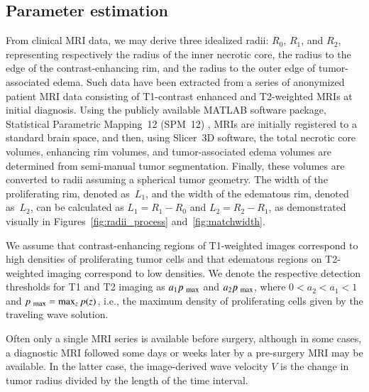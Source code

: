 \documentclass{aims}
\numberwithin{equation}{section}
\begin{document}
\subsection{Parameter estimation}
\label{paramest-sec}

From clinical MRI data, we may derive three idealized radii:
$R_{0}$, $R_{1}$, and $R_{2}$, representing respectively the radius of the
inner necrotic core, the radius to the edge of the contrast-enhancing rim,
and the radius to the outer edge of tumor-associated edema.  Such data have
been extracted from a series of anonymized patient MRI data consisting of
T1-contrast enhanced and T2-weighted MRIs at initial diagnosis.  Using
the publicly available MATLAB software package, Statistical Parametric Mapping~12 (SPM~12) \cite{Penny2007}, MRIs are initially registered to a standard brain
space, and then, using Slicer~3D \cite{Fedorov2012} software, the total necrotic core
volumes, enhancing rim volumes, and tumor-associated edema volumes are
determined from semi-manual tumor segmentation.  Finally, these volumes are
converted to radii assuming a spherical tumor geometry.  The width of the
proliferating rim, denoted as~$L_{1}$, and the width of the edematous rim,
denoted as~$L_{2}$, can be calculated as $L_{1}=R_{1}-R_{0}$ and
$L_{2}=R_{2}-R_{1}$, as demonstrated visually in
Figures~\ref{fig:radii_process} and~\ref{fig:matchwidth}.

We assume that contrast-enhancing regions of T1-weighted images
correspond to high densities of proliferating tumor cells and that edematous
regions on T2-weighted imaging correspond to low densities.  We denote the
respective detection thresholds for T1 and T2 imaging as
$a_1p_{\mbox{\scriptsize max}}$ and $a_2 p_{\mbox{\scriptsize max}}$,
where $0 < a_2 < a_1 < 1$ and 
$p_{\mbox{\scriptsize max}}=\max_{z} p(z)$,
i.e., the maximum density of proliferating cells given by the traveling wave
solution.

Often only a single MRI series is available before surgery, although in some
cases, a diagnostic MRI followed some days or weeks later by a pre-surgery MRI
may be available.  In the latter case, the
image-derived wave velocity $V$ is the change in tumor radius divided
by the length of the time interval.
\end{document}
